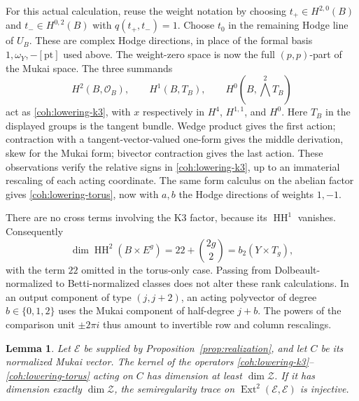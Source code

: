 \documentclass[11pt]{article}
\numberwithin{equation}{section}
\newtheorem{lemma}[theorem]{Lemma}
\theoremstyle{definition}
\theoremstyle{remark}
\begin{document}
For this actual calculation, reuse the weight notation by choosing
\(t_+\in H^{2,0}(B)\) and
\(t_-\in H^{0,2}(B)\) with \(q(t_+,t_-)=1\).
Choose \(t_0\) in the remaining Hodge line of \(U_B\).
These are complex Hodge directions, in place of the formal basis
\(1,\omega_Y,-[\mathrm{pt}]\) used above.  The weight-zero space is
now the full \((p,p)\)-part of the Mukai space.  The three summands
\[
 H^2(B,\mathcal O_B),\qquad H^1(B,T_B),\qquad
 H^0(B,\bigwedge^2 T_B)
\]
act as \eqref{coh:lowering-k3}, with \(x\) respectively in
\(H^4\), \(H^{1,1}\), and \(H^0\).  Here \(T_B\) in the displayed
groups is the tangent bundle.  Wedge product gives the first action;
contraction with a tangent-vector-valued one-form gives the middle
derivation, skew for the Mukai form; bivector contraction gives the
last action.  These observations verify the relative signs in
\eqref{coh:lowering-k3}, up to an immaterial rescaling of each acting
coordinate.  The same form calculus on the abelian factor gives
\eqref{coh:lowering-torus}, now with \(a,b\) the Hodge directions of
weights \(1,-1\).

There are no cross terms involving the K3 factor, because its
\(\operatorname{HH}^1\) vanishes.  Consequently
\begin{equation}\label{coh:hh-dimension}
 \dim\operatorname{HH}^2(B\times E^g)=22+\binom{2g}{2}=b_2(Y\times T_g),
\end{equation}
with the term \(22\) omitted in the torus-only case.  Passing from
Dolbeault-normalized to Betti-normalized classes does not alter these
rank calculations.  In an output component of type \((j,j+2)\), an
acting polyvector of degree \(b\in\{0,1,2\}\) uses the Mukai
component of half-degree \(j+b\).  The powers of the comparison unit
\(\pm2\pi i\) thus amount to invertible row and column rescalings.

\begin{lemma}\label{coh:rank-trace}
Let \(\mathcal E\) be supplied by
Proposition~\ref{prop:realization}, and let \(C\) be its normalized
Mukai vector.  The kernel of the operators
\eqref{coh:lowering-k3}--\eqref{coh:lowering-torus} acting on \(C\)
has dimension at least \(\dim\mathcal Z\).  If it has dimension
exactly \(\dim\mathcal Z\), the semiregularity trace on
\(\operatorname{Ext}^2(\mathcal E,\mathcal E)\) is injective.
\end{lemma}
\end{document}
